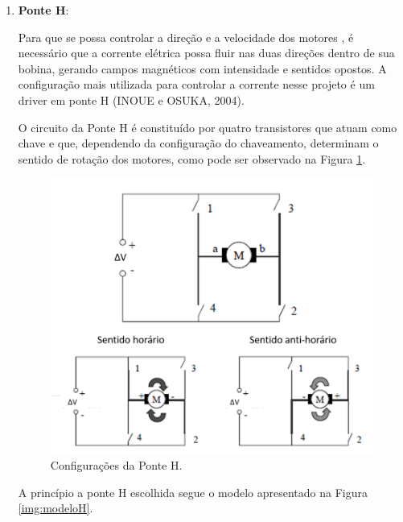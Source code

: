 			\begin{enumerate}
				\item \textbf{Ponte H}:

					Para que se possa controlar a direção e a velocidade dos motores , é necessário que a corrente elétrica possa fluir nas duas direções dentro de sua bobina, gerando campos magnéticos com intensidade e sentidos opostos. A configuração mais utilizada para controlar a corrente nesse projeto é um driver em ponte H (INOUE e OSUKA, 2004).

					O circuito da Ponte H é constituído por quatro transistores que atuam como chave e que, dependendo da configuração do chaveamento, determinam o sentido de rotação dos motores, como pode ser observado na Figura \ref{img:configH}.

					\begin{figure}[H]
						\centering
						\includegraphics[scale=0.3]{figuras/configH.png}
						\caption{Configurações da Ponte H.}
						\label{img:configH}
					\end{figure}

					A princípio a ponte H escolhida segue o modelo apresentado na Figura \ref{img:modeloH}. 


\end{enumerate}
